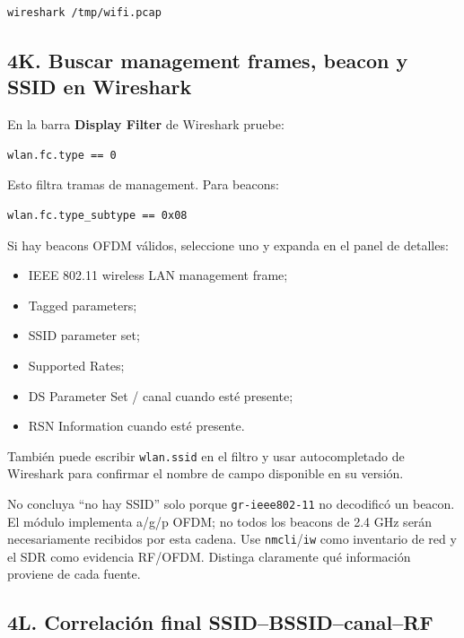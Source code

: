 \begin{lstlisting}
wireshark /tmp/wifi.pcap
\end{lstlisting}

\subsection{4K. Buscar management frames, beacon y SSID en Wireshark}

En la barra \textbf{Display Filter} de Wireshark pruebe:

\begin{lstlisting}
wlan.fc.type == 0
\end{lstlisting}

Esto filtra tramas de management. Para beacons:

\begin{lstlisting}
wlan.fc.type_subtype == 0x08
\end{lstlisting}

Si hay beacons OFDM válidos, seleccione uno y expanda en el panel de detalles:

\begin{itemize}
    \item IEEE 802.11 wireless LAN management frame;
    \item Tagged parameters;
    \item SSID parameter set;
    \item Supported Rates;
    \item DS Parameter Set / canal cuando esté presente;
    \item RSN Information cuando esté presente.
\end{itemize}

También puede escribir \texttt{wlan.ssid} en el filtro y usar autocompletado de Wireshark para confirmar el nombre de campo disponible en su versión.

\begin{alerta}
No concluya ``no hay SSID'' solo porque \texttt{gr-ieee802-11} no decodificó un beacon. El módulo implementa a/g/p OFDM; no todos los beacons de 2.4 GHz serán necesariamente recibidos por esta cadena. Use \texttt{nmcli}/\texttt{iw} como inventario de red y el SDR como evidencia RF/OFDM. Distinga claramente qué información proviene de cada fuente.
\end{alerta}

\subsection{4L. Correlación final SSID--BSSID--canal--RF}


